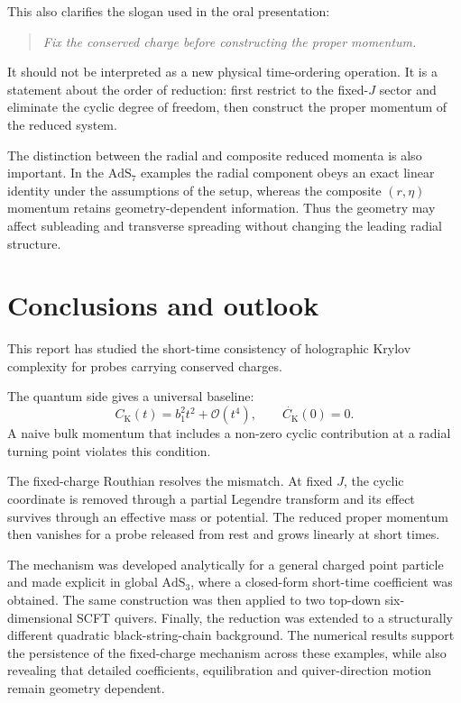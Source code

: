 \documentclass[11pt,a4paper]{article}
\theoremstyle{plain}
\theoremstyle{definition}
\theoremstyle{remark}
\newcommand{\Ck}{C_{\mathrm K}}
\begin{document}
This also clarifies the slogan used in the oral presentation:
\begin{quote}
\emph{Fix the conserved charge before constructing the proper momentum.}
\end{quote}
It should not be interpreted as a new physical time-ordering operation. It is a statement about the order of reduction: first restrict to the fixed-$J$ sector and eliminate the cyclic degree of freedom, then construct the proper momentum of the reduced system.

The distinction between the radial and composite reduced momenta is also important. In the $\mathrm{AdS}_7$ examples the radial component obeys an exact linear identity under the assumptions of the setup, whereas the composite $(r,\eta)$ momentum retains geometry-dependent information. Thus the geometry may affect subleading and transverse spreading without changing the leading radial structure.

\section{Conclusions and outlook}
\label{sec:conclusions}

This report has studied the short-time consistency of holographic Krylov complexity for probes carrying conserved charges.

The quantum side gives a universal baseline:
\begin{equation*}
\Ck(t)=b_1^2t^2+\mathcal O(t^4),
\qquad
\dot{\Ck}(0)=0.
\end{equation*}
A naive bulk momentum that includes a non-zero cyclic contribution at a radial turning point violates this condition.

The fixed-charge Routhian resolves the mismatch. At fixed $J$, the cyclic coordinate is removed through a partial Legendre transform and its effect survives through an effective mass or potential. The reduced proper momentum then vanishes for a probe released from rest and grows linearly at short times.

The mechanism was developed analytically for a general charged point particle and made explicit in global $\mathrm{AdS}_3$, where a closed-form short-time coefficient was obtained. The same construction was then applied to two top-down six-dimensional SCFT quivers. Finally, the reduction was extended to a structurally different quadratic black-string-chain background. The numerical results support the persistence of the fixed-charge mechanism across these examples, while also revealing that detailed coefficients, equilibration and quiver-direction motion remain geometry dependent.
\end{document}

